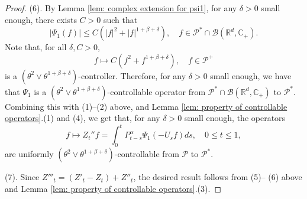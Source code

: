 \documentclass[12pt,a4paper]{amsart}
\theoremstyle{plain}
\theoremstyle{definition}
\numberwithin{equation}{section}
\begin{document}
\begin{proof}
  (6). By  Lemma \ref{lem: complex extension for psi1}, for any $\delta > 0$ small enough, there exists  $C>0$ such that
  \[
    |\Psi_1(f)|
    \le C(|f|^2+|f|^{1+\beta+ \delta})
    , \quad f\in \mathcal P^*\cap\mathcal B(\mathbb R^d, \mathbb C_+).
  \]
  Note that, for all $\delta, C>0$,
  \[
    f \mapsto C(f^2+f^{1+\beta+\delta})
    , \quad f\in \mathcal P^+
  \]
  is a $(\theta^2 \vee \theta^{1+\beta+\delta})$-controller.
  Therefore, for any $\delta > 0$ small enough, we have that $\Psi_1$ is a $(\theta^2 \vee \theta^{1+\beta+\delta})$-controllable operator from $\mathcal P^*\cap\mathcal B(\mathbb R^d, \mathbb C_+)$ to $\mathcal P^*$.
  Combining  this with  (1)--(2) above,
  and Lemma \ref{lem: property of controllable operators}.(1) and (4), we get that, for any $\delta > 0$ small enough, the operators
  \[
    f
    \mapsto Z_t'' f
    = \int_0^t P_{t-s}^\alpha \Psi_1(-U_sf)ds
    , \quad 0\leq t\leq 1,
  \]
  are uniformly $(\theta^2 \vee \theta^{1+\beta+\delta})$-controllable from $\mathcal P$ to $\mathcal P^*$.

     (7). Since $Z'''_t = (Z'_t-Z_t)+Z''_t$, the desired result follows from (5)-- (6) above and Lemma \ref{lem: property of controllable operators}.(3).
\end{proof}
\end{document}

